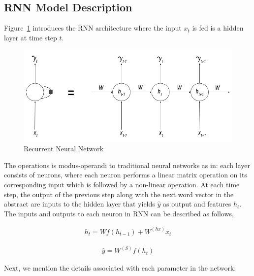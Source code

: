 \subsection{RNN Model Description}
Figure~\ref{fig:rnnarch} introduces the RNN architecture where the input $x_t$ is fed is a hidden layer at time step $t$. 
\begin{figure}
    \centering
    \includegraphics[scale=0.5]{Figures/rnn_figure_1.png}
    \caption{Recurrent Neural Network}
    \label{fig:rnnarch}
\end{figure}
The operations is modus-operandi to traditional neural networks as in: each layer consists of neurons, where each neuron performs a linear matrix operation on its corresponding input which is followed by a non-linear operation. At each time step, the output of the previous step along with the next word vector in the abstract are inputs to the hidden layer that yields $\widehat{y}$ as output and features $h_t$. The inputs and outputs to each neuron in RNN can be described as follows,

\begin{equation}
\begin{aligned}
	h_t = W f(h_{t-1}) + W^{(hx)}x_t
\end{aligned}
\end{equation}

\begin{equation}
\begin{aligned}
	\widehat{y} = W^{(S)}f(h_{t})
\end{aligned}
\end{equation}

Next, we mention the details associated with each parameter in the network:

